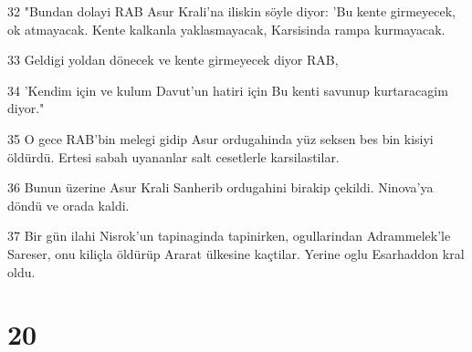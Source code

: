 \par 32 "Bundan dolayi RAB Asur Krali'na iliskin söyle diyor: 'Bu kente girmeyecek, ok atmayacak. Kente kalkanla yaklasmayacak, Karsisinda rampa kurmayacak.
\par 33 Geldigi yoldan dönecek ve kente girmeyecek diyor RAB,
\par 34 'Kendim için ve kulum Davut'un hatiri için Bu kenti savunup kurtaracagim diyor."
\par 35 O gece RAB'bin melegi gidip Asur ordugahinda yüz seksen bes bin kisiyi öldürdü. Ertesi sabah uyananlar salt cesetlerle karsilastilar.
\par 36 Bunun üzerine Asur Krali Sanherib ordugahini birakip çekildi. Ninova'ya döndü ve orada kaldi.
\par 37 Bir gün ilahi Nisrok'un tapinaginda tapinirken, ogullarindan Adrammelek'le Sareser, onu kiliçla öldürüp Ararat ülkesine kaçtilar. Yerine oglu Esarhaddon kral oldu.

\chapter{20}

